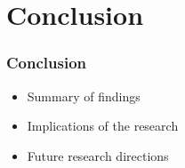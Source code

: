 \documentclass{beamer}
\begin{document}
\section{Conclusion}
\begin{frame}
    \frametitle{Conclusion}
    \begin{itemize}
        \item Summary of findings
        \item Implications of the research
        \item Future research directions
    \end{itemize}
\end{frame}
\end{document}
